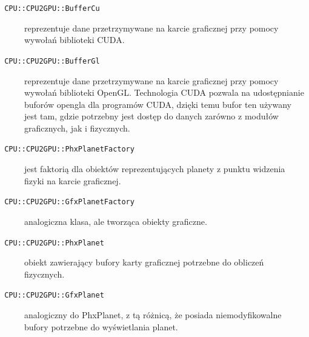 \begin{description}
\item[\texttt{ CPU::CPU2GPU::BufferCu}] reprezentuje dane przetrzymywane na karcie graficznej przy pomocy wywołań biblioteki CUDA.
\item[\texttt{ CPU::CPU2GPU::BufferGl}] reprezentuje dane przetrzymywane na karcie graficznej przy pomocy wywołań biblioteki OpenGL. Technologia CUDA pozwala na udostępnianie buforów opengla dla programów CUDA, dzięki temu bufor ten używany jest tam, gdzie potrzebny jest dostęp do danych zarówno z modułów graficznych, jak i fizycznych.
\item[\texttt{ CPU::CPU2GPU::PhxPlanetFactory}] jest faktorią dla obiektów reprezentujących planety z punktu widzenia fizyki na karcie graficznej.
\item[\texttt{ CPU::CPU2GPU::GfxPlanetFactory}] analogiczna klasa, ale tworząca obiekty graficzne.
\item[\texttt{ CPU::CPU2GPU::PhxPlanet}] obiekt zawierający bufory karty graficznej potrzebne do obliczeń fizycznych.
\item[\texttt{ CPU::CPU2GPU::GfxPlanet}] analogiczny do PhxPlanet, z tą różnicą, że posiada niemodyfikowalne bufory potrzebne do wyświetlania planet.
\end{description}


